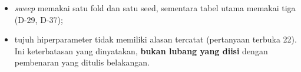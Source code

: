 \begin{itemize}
\begin{itemize}
                    bukan optimum yang diturunkan --- tidak ada kriteria seleksi
                    yang pernah diterapkan padanya (D-04);
              \item \textit{sweep} memakai satu fold dan satu seed, sementara
                    tabel utama memakai tiga (D-29, D-37);
              \item tujuh hiperparameter tidak memiliki alasan tercatat
                    (pertanyaan terbuka 22). Ini keterbatasan yang dinyatakan,
                    \textbf{bukan lubang yang diisi} dengan pembenaran yang
                    ditulis belakangan.
          \end{itemize}
\end{itemize}
